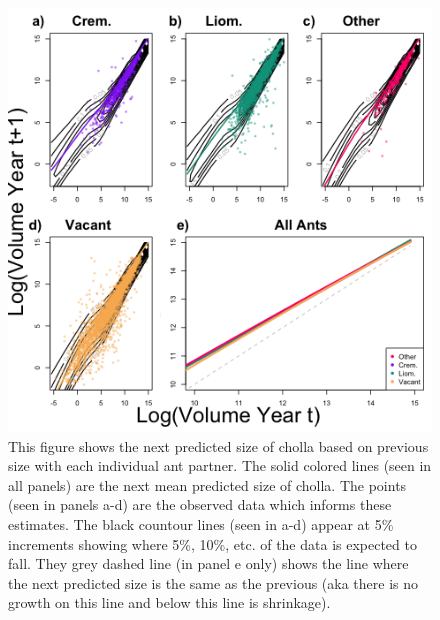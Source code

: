 \documentclass[11pt]{article}
\begin{document}
\begin{figure}
	\includegraphics[width = 0.95\linewidth]{Figures/grow_contour.png}
	\caption{This figure shows the next predicted size of cholla based on previous size with each individual ant partner. The solid colored lines (seen in all panels) are the next mean predicted size of cholla. The points (seen in panels a-d) are the observed data which informs these estimates. The black countour lines (seen in a-d) appear at 5\% increments showing where 5\%, 10\%, etc. of the data is expected to fall. They grey dashed line (in panel e only) shows the line where the next predicted size is the same as the previous (aka there is no growth on this line and below this line is shrinkage). }
	\label{fig:Grow}
\end{figure}
\end{document}
